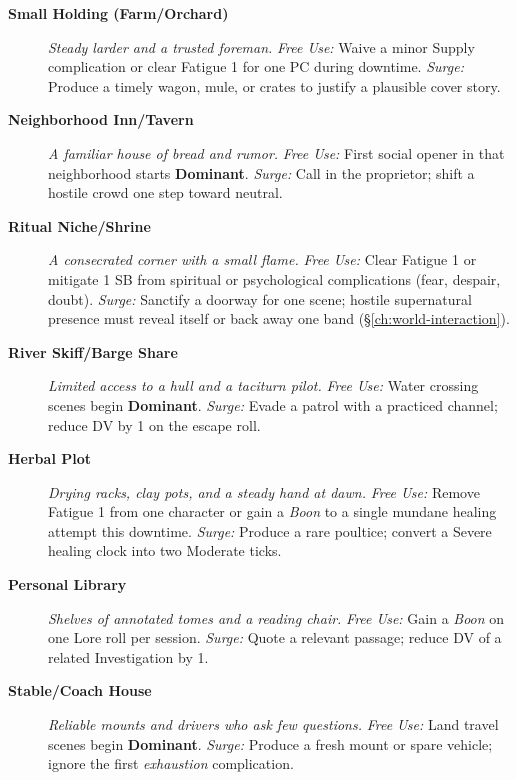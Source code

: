 \begin{description}
  \item[\textbf{Small Holding (Farm/Orchard)}]  \emph{Steady larder and a trusted foreman.} \emph{Free Use:} Waive a minor Supply complication or clear Fatigue 1 for one PC during downtime. \emph{Surge:} Produce a timely wagon, mule, or crates to justify a plausible cover story.

  \item[\textbf{Neighborhood Inn/Tavern}]  \emph{A familiar house of bread and rumor.} \emph{Free Use:} First social opener in that neighborhood starts \textbf{Dominant}. \emph{Surge:} Call in the proprietor; shift a hostile crowd one step toward neutral.

  \item[\textbf{Ritual Niche/Shrine}]  \emph{A consecrated corner with a small flame.} \emph{Free Use:} Clear Fatigue 1 or mitigate 1 SB from spiritual or psychological complications (fear, despair, doubt). \emph{Surge:} Sanctify a doorway for one scene; hostile supernatural presence must reveal itself or back away one band (\S\ref{ch:world-interaction}).

  \item[\textbf{River Skiff/Barge Share}]  \emph{Limited access to a hull and a taciturn pilot.} \emph{Free Use:} Water crossing scenes begin \textbf{Dominant}. \emph{Surge:} Evade a patrol with a practiced channel; reduce DV by 1 on the escape roll.

  \item[\textbf{Herbal Plot}]  \emph{Drying racks, clay pots, and a steady hand at dawn.} \emph{Free Use:} Remove Fatigue 1 from one character or gain a \emph{Boon} to a single mundane healing attempt this downtime. \emph{Surge:} Produce a rare poultice; convert a Severe healing clock into two Moderate ticks.

  \item[\textbf{Personal Library}]  \emph{Shelves of annotated tomes and a reading chair.} \emph{Free Use:} Gain a \emph{Boon} on one Lore roll per session. \emph{Surge:} Quote a relevant passage; reduce DV of a related Investigation by 1.

  \item[\textbf{Stable/Coach House}]  \emph{Reliable mounts and drivers who ask few questions.} \emph{Free Use:} Land travel scenes begin \textbf{Dominant}. \emph{Surge:} Produce a fresh mount or spare vehicle; ignore the first \emph{exhaustion} complication.


\end{description}
